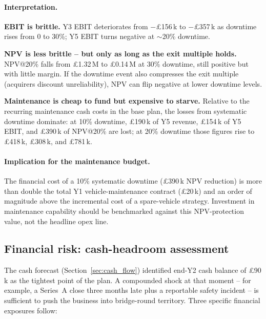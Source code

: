 \paragraph{Interpretation.}
\begin{tightitemize}
  \item \textbf{EBIT is brittle.} Y3 EBIT deteriorates from
        $-$\pounds156\,k to $-$\pounds357\,k as downtime rises
        from 0 to 30\%; Y5 EBIT turns negative at $\sim$20\%
        downtime.
  \item \textbf{NPV is less brittle -- but only as long as the
        exit multiple holds.} NPV@20\% falls from
        \pounds1.32\,M to \pounds0.14\,M at 30\% downtime, still
        positive but with little margin. If the downtime event
        also compresses the exit multiple
        (acquirers discount unreliability), NPV can flip negative
        at lower downtime levels.
  \item \textbf{Maintenance is cheap to fund but expensive to starve.}
        Relative to the recurring maintenance cash costs in the base plan,
        the losses from systematic downtime dominate: at 10\% downtime,
        \pounds190\,k of Y5 revenue, \pounds154\,k of Y5 EBIT, and
        \pounds390\,k of NPV@20\% are lost; at 20\% downtime those figures
        rise to \pounds418\,k, \pounds308\,k, and \pounds781\,k.
\end{tightitemize}

\paragraph{Implication for the maintenance budget.} The financial
cost of a 10\% systematic downtime (\pounds390\,k NPV reduction) is
more than double the total Y1 vehicle-maintenance contract
(\pounds20\,k) and an order of magnitude above the incremental
cost of a spare-vehicle strategy. Investment in maintenance
capability should be benchmarked against this NPV-protection
value, not the headline opex line.

\subsection{Financial risk: cash-headroom assessment}
\label{sec:cash_risk}

The cash forecast (Section~\ref{sec:cash_flow}) identified
end-Y2 cash balance of \pounds90\,k as the tightest point of the
plan. A compounded shock at that moment -- for example, a
Series~A close three months late plus a reportable safety
incident -- is sufficient to push the business into bridge-round
territory. Three specific financial exposures follow:

